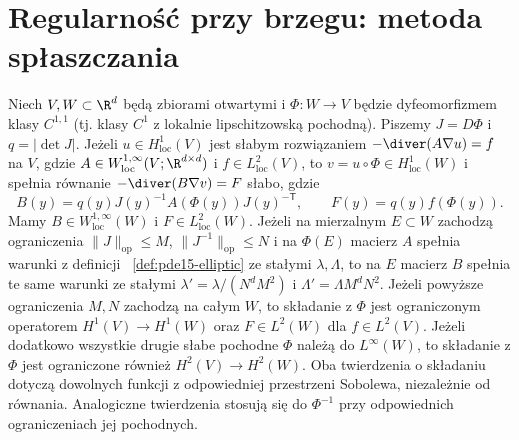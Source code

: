 \section{Regularność przy brzegu: metoda spłaszczania}
\label{sec:pde15-boundary}

\begin{lemat}
\label{lem:pde15-flatten}
Niech $V,W\subset\R^d$ będą zbiorami otwartymi i
$\Phi:W\to V$ będzie dyfeomorfizmem klasy $C^{1,1}$
(tj. klasy $C^1$ z lokalnie lipschitzowską pochodną).
Piszemy $J=D\Phi$ i $q=|\det J|$. Jeżeli
$u\in H^1_{\mathrm{loc}}(V)$ jest słabym rozwiązaniem
$-\diver(A\nabla u)=f$ na $V$, gdzie
$A\in W^{1,\infty}_{\mathrm{loc}}(V;\R^{d\times d})$
i $f\in L^2_{\mathrm{loc}}(V)$, to
$v=u\circ\Phi\in H^1_{\mathrm{loc}}(W)$ i spełnia równanie
$-\diver(B\nabla v)=F$ słabo, gdzie
\[
 B(y)=q(y)J(y)^{-1}A(\Phi(y))J(y)^{-\mathsf T},
 \qquad F(y)=q(y)f(\Phi(y)).
\]
Mamy $B\in W^{1,\infty}_{\mathrm{loc}}(W)$ i
$F\in L^2_{\mathrm{loc}}(W)$.
Jeżeli na mierzalnym $E\subset W$ zachodzą ograniczenia
$\|J\|_{\mathrm{op}}\le M$, $\|J^{-1}\|_{\mathrm{op}}\le N$
i na $\Phi(E)$ macierz $A$ spełnia warunki z definicji
~\ref{def:pde15-elliptic} ze stałymi $\lambda,\Lambda$,
to na $E$ macierz $B$ spełnia te same warunki ze stałymi
$\lambda'= \lambda/(N^d M^2)$ i
$\Lambda'=\Lambda M^d N^2$.
Jeżeli powyższe ograniczenia $M,N$ zachodzą na całym $W$,
to składanie z $\Phi$ jest ograniczonym operatorem
$H^1(V)\to H^1(W)$ oraz $F\in L^2(W)$ dla $f\in L^2(V)$.
Jeżeli dodatkowo wszystkie drugie słabe pochodne $\Phi$
należą do $L^\infty(W)$, to składanie z $\Phi$ jest
ograniczone również $H^2(V)\to H^2(W)$.
Oba twierdzenia o składaniu dotyczą dowolnych funkcji
z odpowiedniej przestrzeni Sobolewa, niezależnie od równania. Analogiczne twierdzenia stosują się
do $\Phi^{-1}$ przy odpowiednich ograniczeniach jej pochodnych.
\end{lemat}
